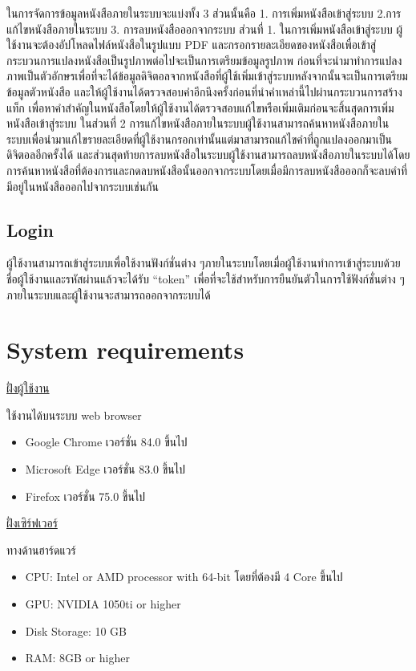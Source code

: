 ในการจัดการข้อมูลหนังสือภายในระบบจะแบ่งทั้ง 3 ส่วนนั้นคือ 1. การเพิ่มหนังสือเข้าสู่ระบบ 2.การแก้ไขหนังสือภายในระบบ  3. การลบหนังสือออกจากระบบ 
ส่วนที่ 1. ในการเพิ่มหนังสือเข้าสู่ระบบ ผู้ใช้งานจะต้องอัปโหลดไฟล์หนังสือในรูปแบบ PDF และกรอกรายละเอียดของหนังสือเพื่อเข้าสู่กระบวนการแปลงหนังสือเป็นรูปภาพต่อไปจะเป็นการเตรียมข้อมูลรูปภาพ ก่อนที่จะนำมาทำการแปลงภาพเป็นตัวอักษรเพื่อที่จะได้ข้อมูลดิจิตอลจากหนังสือที่ผู้ใช้เพิ่มเข้าสู่ระบบหลังจากนั้นจะเป็นการเตรียมข้อมูลตัวหนังสือ และให้ผู้ใช้งานได้ตรวจสอบคำอีกนึงครั้งก่อนที่นำคำเหล่านี้ไปผ่านกระบวนการสร้างแท็ก เพื่อหาคำสำคัญในหนังสือโดยให้ผู้ใช้งานได้ตรวจสอบแก้ไขหรือเพิ่มเติมก่อนจะสิ้นสุดการเพิ่มหนังสือเข้าสู่ระบบ ในส่วนที่ 2 การแก้ไขหนังสือภายในระบบผู้ใช้งานสามารถค้นหาหนังสือภายในระบบเพื่อนำมาแก้ไขรายละเอียดที่ผู้ใช้งานกรอกเท่านั้นแต่มาสามารถแก้ไขคำที่ถูกแปลงออกมาเป็นดิจิตอลอีกครั้งได้ และส่วนสุดท้ายการลบหนังสือในระบบผู้ใช้งานสามารถลบหนังสือภายในระบบได้โดยการค้นหาหนังสือที่ต้องการและกดลบหนังสือนั้นออกจากระบบโดยเมื่อมีการลบหนังสือออกก็จะลบคำที่มีอยู่ในหนังสือออกไปจากระบบเช่นกัน

\subsection{Login}

ผู้ใช้งานสามารถเข้าสู่ระบบเพื่อใช้งานฟังก์ชั่นต่าง ๆภายในระบบโดยเมื่อผู้ใช้งานทำการเข้าสู่ระบบด้วยชื่อผู้ใช้งานและรหัสผ่านแล้วจะได้รับ “token” เพื่อที่จะใช้สำหรับการยืนยันตัวในการใช้ฟังก์ชั่นต่าง ๆภายในระบบและผู้ใช้งานจะสามารถออกจากระบบได้

\section{System requirements}

\underline{ฝั่งผู้ใช้งาน}

ใช้งานได้บนระบบ web browser 

\begin{itemize}
    \item Google Chrome เวอร์ชั่น 84.0 ขึ้นไป 
    \item Microsoft Edge เวอร์ชั่น 83.0 ขึ้นไป
    \item Firefox เวอร์ชั่น 75.0 ขึ้นไป
\end{itemize}
 
\underline{ฝั่งเซิร์ฟเวอร์}
		
ทางด้านฮาร์ดแวร์

        \begin{itemize}
            \item CPU: Intel or AMD processor with 64-bit โดยที่ต้องมี 4 Core ขึ้นไป
            \item GPU: NVIDIA 1050ti or higher
            \item Disk Storage: 10 GB
            \item RAM: 8GB or higher
        \end{itemize}
        

